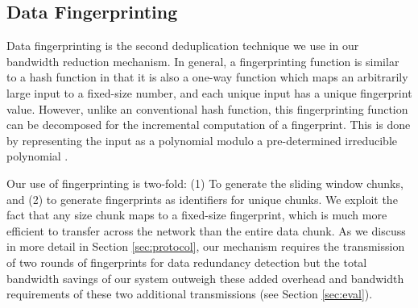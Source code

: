 \subsection{Data Fingerprinting}
\label{sec:fingerprinting}
Data fingerprinting is the second deduplication technique we use in our bandwidth reduction mechanism. In general, a fingerprinting function is similar to a hash function in that it is also a one-way function which maps an arbitrarily large input to a fixed-size number, and each unique input has a unique fingerprint value. However, unlike an conventional hash function, this fingerprinting function can be decomposed for the incremental computation of a fingerprint. This is done by representing the input as a polynomial modulo a pre-determined irreducible polynomial \cite{rabin,lbfs}.

Our use of fingerprinting is two-fold: (1) To generate the sliding window chunks, and (2) to generate fingerprints as identifiers for unique chunks. We exploit the fact that any size chunk maps to a fixed-size fingerprint, which is much more efficient to transfer across the network than the entire data chunk. As we discuss in more detail in Section \ref{sec:protocol}, our mechanism requires the transmission of two rounds of fingerprints for data redundancy detection but the total bandwidth savings of our system outweigh these added overhead and bandwidth requirements of these two additional transmissions (see Section \ref{sec:eval}).